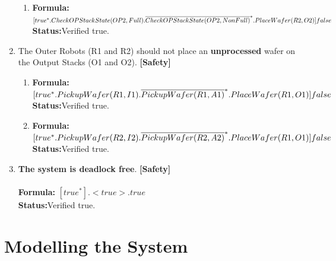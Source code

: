\documentclass[a4paper,12pt]{article}
\begin{document}
\begin{enumerate}
\begin{enumerate}
			\item \textbf{Formula:} $[true^* . CheckOPStackState(OP2,Full). \\\overline{CheckOPStackState(OP2, NonFull)}^* .PlaceWafer(R2, O2)] false $
			\\\textbf{Status:}Verified true.
		\end{enumerate}
		\item The Outer Robots (R1 and R2) should not place an \textbf{unprocessed} wafer on the Output Stacks (O1 and O2). \textbf{[Safety]}
		\begin{enumerate}
			
			\item \textbf{Formula:} $[true^* . PickupWafer(R1, I1) .\overline{PickupWafer(R1, A1)}^* . 
			\\PlaceWafer(R1, O1)] false $
			\\\textbf{Status:}Verified true.
			
			\item \textbf{Formula:} $[true^* . PickupWafer(R2, I2) .\overline{PickupWafer(R2, A2)}^* . 
			\\PlaceWafer(R1, O1)] false $
			\\\textbf{Status:}Verified true.
			
			
			
			
		\end{enumerate}
		
		\item \textbf{The system is deadlock free}. \textbf{[Safety]}
		\\
		\\\textbf{Formula:} $[true^*]. <true> . true$
		\\\textbf{Status:}Verified true.
	\end{enumerate}
	
	\newpage
	\section{Modelling the System}
\end{document}
